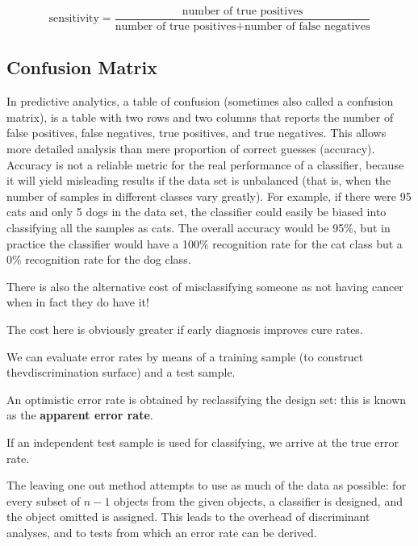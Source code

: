\[ \mbox{sensitivity} = \frac{ \mbox{number of true positives} } {\mbox{number of true positives} + \mbox{number of false negatives}} \]


\subsection*{Confusion Matrix}

In predictive analytics, a table of confusion (sometimes also called a confusion matrix), is a table with two rows and two columns that reports the number of false positives, false negatives, true positives, and true negatives. This allows more detailed analysis than mere proportion of correct guesses (accuracy). Accuracy is not a reliable metric for the real performance of a classifier, because it will yield misleading results if the data set is unbalanced (that is, when the number of samples in different classes vary greatly). For example, if there were 95 cats and only 5 dogs in the data set, the classifier could easily be biased into classifying all the samples as cats. The overall accuracy would be 95\%, but  in practice the classifier would have a 100\% recognition rate for the cat class but a 0\% recognition rate for the dog class.


There is also the alternative cost of misclassifying someone as not having cancer when in fact they do have it! 

The cost here is obviously greater if early diagnosis improves cure rates.


We can evaluate error rates by means of a training sample (to construct thevdiscrimination surface) and a test sample.

An optimistic error rate is obtained by reclassifying the design set: this is known as the \textbf{apparent error rate}.

If an independent test sample is used for classifying, we arrive at the true error rate.

The leaving one out method attempts to use as much of the data as possible: for every subset of $n-1$ objects from the given objects, a classifier is designed, 
and the object omitted is assigned. This leads to the overhead of discriminant analyses, and to tests from which an error rate can be derived.

